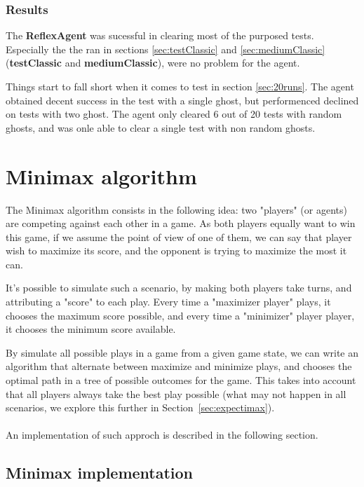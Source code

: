\documentclass{article}
\begin{document}
\subsubsection{Results}
The \textbf{ReflexAgent} was sucessful in clearing most of the purposed tests. Especially the the ran in sections \ref{sec:testClassic} and \ref{sec:mediumClassic} (\textbf{testClassic} and \textbf{mediumClassic}), were no problem for the agent.

Things start to fall short when it comes to test in section \ref{sec:20runs}. The agent obtained decent success in the test with a single ghost, but performenced declined on tests with two ghost. The agent only cleared 6 out of 20 tests with random ghosts, and was onle able to clear a single test with non random ghosts.

\hfill\break
\pagebreak
\section{Minimax algorithm}

The Minimax algorithm consists in the following idea: two "players" (or agents) are competing against each other in a game. As both players equally want to win this game, if we assume the point of view of one of them, we can say that player wish to maximize its score, and the opponent is trying to maximize the most it can.

It's possible to simulate such a scenario, by making both players take turns, and attributing a "score" to each play. Every time a "maximizer player" plays, it chooses the maximum score possible, and every time a "minimizer" player player, it chooses the minimum score available.

By simulate all possible plays in a game from a given game state, we can write an algorithm that alternate between maximize and minimize plays, and chooses the optimal path in a tree of possible outcomes for the game. This takes into account that all players always take the best play possible (what may not happen in all scenarios, we explore this further in Section~\ref{sec:expectimax}).
~\\
~\\
An implementation of such approch is described in the following section.

\subsection{Minimax implementation}
\end{document}
